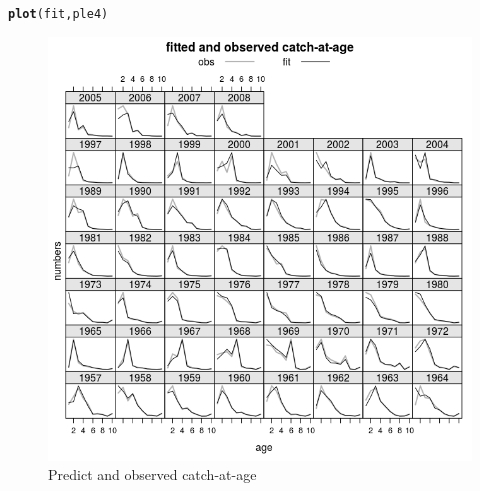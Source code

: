 \documentclass[a4paper,english,10pt]{article}\usepackage[]{graphicx}\usepackage[]{color}
\makeatletter
\def\maxwidth{ %
  \ifdim\Gin@nat@width>\linewidth
    \linewidth
  \else
    \Gin@nat@width
  \fi
}
\newcommand{\hlstd}[1]{\textcolor[rgb]{0.345,0.345,0.345}{#1}}%
\newcommand{\hlkwd}[1]{\textcolor[rgb]{0.737,0.353,0.396}{\textbf{#1}}}%
\newenvironment{kframe}{%
 \def\at@end@of@kframe{}%
 \ifinner\ifhmode%
  \def\at@end@of@kframe{\end{minipage}}%
  \begin{minipage}{\columnwidth}%
 \fi\fi%
 \def\FrameCommand##1{\hskip\@totalleftmargin \hskip-\fboxsep
 \colorbox{shadecolor}{##1}\hskip-\fboxsep
     \hskip-\linewidth \hskip-\@totalleftmargin \hskip\columnwidth}%
 \MakeFramed {\advance\hsize-\width
   \@totalleftmargin\z@ \linewidth\hsize
   \@setminipage}}%
 {\par\unskip\endMakeFramed%
 \at@end@of@kframe}
\newenvironment{knitrout}{}{} %
\makeatother
\begin{document}
\begin{knitrout}
\color{fgcolor}\begin{kframe}
\begin{alltt}
\hlkwd{plot}\hlstd{(fit, ple4)}
\end{alltt}
\end{kframe}\begin{figure}[H]

{\centering \includegraphics[width=\maxwidth]{figure/selplt-1} 

}

\caption[Predict and observed catch-at-age]{Predict and observed catch-at-age}\label{fig:selplt}
\end{figure}


\end{knitrout}
\end{document}
